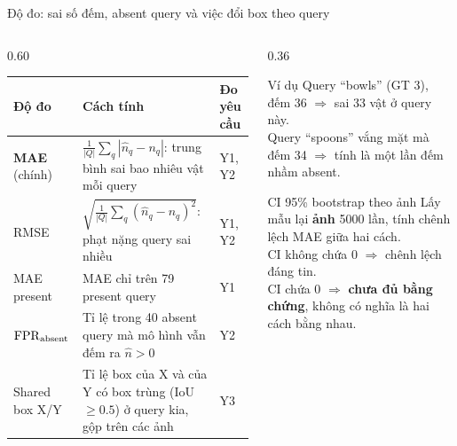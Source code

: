 \documentclass[aspectratio=169,10pt]{beamer}
\gdef\currentsource{}
\newcommand{\source}[1]{\gdef\currentsource{#1}}
\begin{document}
\begin{frame}{Độ đo: sai số đếm, absent query và việc đổi box theo query}
\source{Tính trên 119 query test hợp lệ (79 present, 40 absent); bootstrap: Efron, 1979}
\begin{columns}[T]
\begin{column}{0.60\textwidth}
\scriptsize
\renewcommand{\arraystretch}{1.25}
\begin{tabularx}{\linewidth}{@{}l >{\raggedright\arraybackslash}X l@{}}
\toprule
Độ đo & Cách tính & Đo yêu cầu\\
\midrule
\textbf{MAE} (chính) & $\frac{1}{|Q|}\sum_q|\hat n_q-n_q|$: trung bình sai bao nhiêu vật mỗi query & Y1, Y2\\
RMSE & $\sqrt{\frac{1}{|Q|}\sum_q(\hat n_q-n_q)^2}$: phạt nặng query sai nhiều & Y1, Y2\\
MAE present & MAE chỉ trên 79 present query & Y1\\
$\mathrm{FPR}_{\text{absent}}$ & Tỉ lệ trong 40 absent query mà mô hình vẫn đếm ra $\hat n>0$ & Y2\\
Shared box X/Y & Tỉ lệ box của X và của Y có box trùng (IoU $\ge 0.5$) ở query kia, gộp trên các ảnh & Y3\\
\bottomrule
\end{tabularx}
\end{column}
\begin{column}{0.36\textwidth}
\begin{block}{Ví dụ}
\scriptsize Query ``bowls'' (GT 3), \Btwo{} đếm 36 $\Rightarrow$ sai 33 vật ở query này.\\
Query ``spoons'' vắng mặt mà đếm 34 $\Rightarrow$ tính là một lần đếm nhầm absent.
\end{block}
\begin{block}{CI 95\% bootstrap theo ảnh}
\scriptsize Lấy mẫu lại \textbf{ảnh} 5000 lần, tính chênh lệch MAE giữa hai cách.\\
CI không chứa 0 $\Rightarrow$ chênh lệch đáng tin.\\
CI chứa 0 $\Rightarrow$ \textbf{chưa đủ bằng chứng}, không có nghĩa là hai cách bằng nhau.
\end{block}
\end{column}
\end{columns}
\end{frame}
\end{document}
